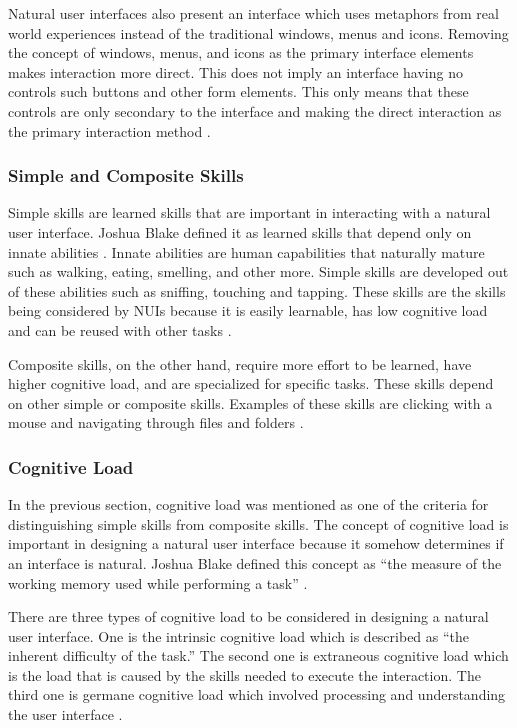 Natural user interfaces also present an interface which uses metaphors from real world experiences instead of the traditional windows, menus and icons. Removing the concept of windows, menus, and icons as the primary interface elements makes interaction more direct. This does not imply an interface having no controls such buttons and other form elements. This only means that these controls are only secondary to the interface and making the direct interaction as the primary interaction method \cite{blake2011natural}.

\subsubsection{Simple and Composite Skills}

Simple skills are learned skills that are important in interacting with a natural user interface. Joshua Blake defined it as learned skills that depend only on innate abilities \cite{blake2011natural}. Innate abilities are human capabilities that naturally mature such as walking, eating, smelling, and other more. Simple skills are developed out of these abilities such as sniffing, touching and tapping. These skills are the skills being considered by NUIs because it is easily learnable, has low cognitive load and can be reused with other tasks \cite{blake2011natural}.

Composite skills, on the other hand, require more effort to be learned, have higher cognitive load, and are specialized for specific tasks. These skills depend on other simple or composite skills. Examples of these skills are clicking with a mouse and navigating through files and folders \cite{blake2011natural}.


\subsubsection{Cognitive Load}

In the previous section, cognitive load was mentioned as one of the criteria for distinguishing simple skills from composite skills. The concept of cognitive load is important in designing a natural user interface because it somehow determines if an interface is natural. Joshua Blake defined this concept as ``the measure of the working memory used while performing a task'' \cite{blake2011natural}.

There are three types of cognitive load to be considered in designing a natural user interface. One is the intrinsic cognitive load which is described as ``the inherent difficulty of the task.'' The second one is extraneous cognitive load which is the load that is caused by the skills needed to execute the interaction. The third one is germane cognitive load which involved processing and understanding the user interface \cite{blake2011natural}.

